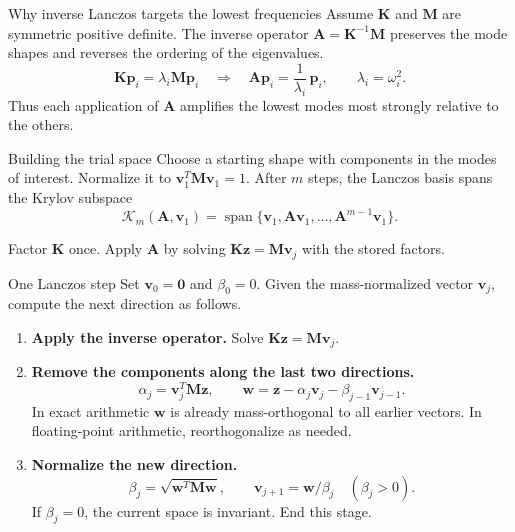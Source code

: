 \documentclass[aspectratio=169]{beamer}
\begin{document}
\begin{frame}{Why inverse Lanczos targets the lowest frequencies}
  \small
  Assume $\mathbf K$ and $\mathbf M$ are symmetric positive definite.
  The inverse operator $\mathbf A=\mathbf K^{-1}\mathbf M$ preserves the
  mode shapes and reverses the ordering of the eigenvalues.
  \[
    \mathbf K\mathbf p_i=\lambda_i\mathbf M\mathbf p_i
    \quad\Longrightarrow\quad
    \mathbf A\mathbf p_i=\frac{1}{\lambda_i}\,\mathbf p_i,
    \qquad \lambda_i=\omega_i^2 .
  \]
  Thus each application of $\mathbf A$ amplifies the lowest modes most
  strongly relative to the others.

  \begin{block}{Building the trial space}
    Choose a starting shape with components in the modes of interest.
    Normalize it to $\mathbf v_1^T\mathbf M\mathbf v_1=1$. After $m$ steps,
    the Lanczos basis spans the Krylov subspace
    \[
      \mathcal K_m(\mathbf A,\mathbf v_1)
      =\operatorname{span}\{\mathbf v_1,\mathbf A\mathbf v_1,\ldots,
      \mathbf A^{m-1}\mathbf v_1\}.
    \]
  \end{block}
  Factor $\mathbf K$ once. Apply $\mathbf A$ by solving
  $\mathbf K\mathbf z=\mathbf M\mathbf v_j$ with the stored factors.
\end{frame}

\begin{frame}{One Lanczos step}
  \small
  Set $\mathbf v_0=\mathbf 0$ and $\beta_0=0$. Given the mass-normalized
  vector $\mathbf v_j$, compute the next direction as follows.
  \begin{enumerate}
    \item \textbf{Apply the inverse operator.}\quad
          Solve $\mathbf K\mathbf z=\mathbf M\mathbf v_j$.
    \item \textbf{Remove the components along the last two directions.}
          \[
            \alpha_j=\mathbf v_j^T\mathbf M\mathbf z,\qquad
            \mathbf w=\mathbf z-\alpha_j\mathbf v_j-\beta_{j-1}\mathbf v_{j-1}.
          \]
          In exact arithmetic $\mathbf w$ is already mass-orthogonal to all
          earlier vectors. In floating-point arithmetic, reorthogonalize as needed.
    \item \textbf{Normalize the new direction.}
          \[
            \beta_j=\sqrt{\mathbf w^T\mathbf M\mathbf w},\qquad
            \mathbf v_{j+1}=\mathbf w/\beta_j \quad(\beta_j>0).
          \]
          If $\beta_j=0$, the current space is invariant. End this stage.
  \end{enumerate}
\end{frame}
\end{document}
